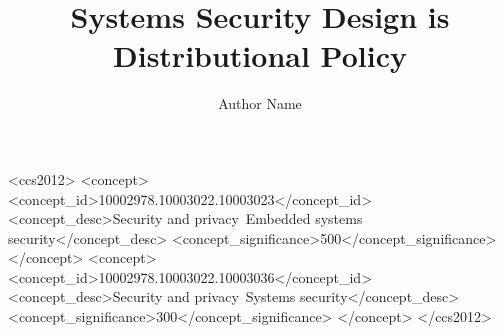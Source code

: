 \documentclass[sigconf]{acmart}
\title{Systems Security Design is Distributional Policy}
\author{Author Name}
\affiliation{%
  \institution{Affiliation}
  \city{City}
  \country{Country}
}
\begin{document}


\maketitle

\begin{CCSXML}
<ccs2012>
<concept>
<concept_id>10002978.10003022.10003023</concept_id>
<concept_desc>Security and privacy~Embedded systems security</concept_desc>
<concept_significance>500</concept_significance>
</concept>
<concept>
<concept_id>10002978.10003022.10003036</concept_id>
<concept_desc>Security and privacy~Systems security</concept_desc>
<concept_significance>300</concept_significance>
</concept>
</ccs2012>
\end{CCSXML}











% 
% 
% 
% 
% 
% 
% 
% 




\end{document}
